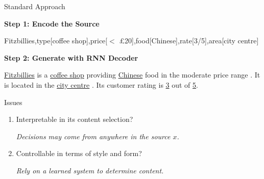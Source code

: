 
\begin{frame}{Standard Approach}


\textbf{Step 1: Encode the Source}
\air

\begin{small}
Fitzbillies,type[coffee shop],price[$<$ \pounds 20],food[Chinese],rate[3/5],area[city centre]
\end{small}

\vspace{0.3cm}

\textbf{Step 2: Generate with RNN Decoder}

\air

\underline{Fitzbillies}  is a  \underline{coffee shop}  providing  \underline{Chinese} food in the  moderate  price range  .  It is  located in the  \underline{city centre}  .  Its customer rating is  \underline{3} out of \underline{5}.

\end{frame}

\begin{frame}{Issues}
\begin{enumerate}
\item Interpretable in its content selection?
  \air

  \textit{Decisions may come from anywhere in the source $x$.}

  \air

\item Controllable in terms of style and form?
  \air

  \textit{Rely on a learned system to determine content.}
\end{enumerate}

\end{frame}


